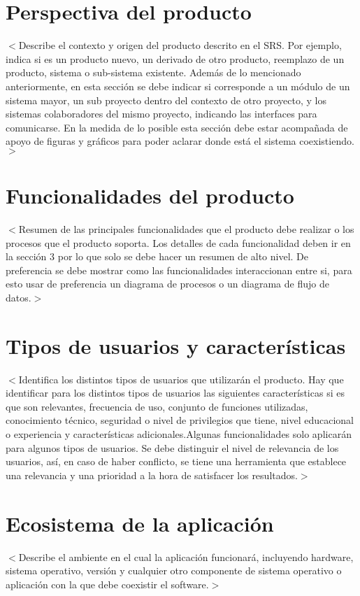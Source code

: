 \documentclass{scrreprt}
\begin{document}
\section{Perspectiva del producto}
$<$Describe el contexto y origen del producto descrito en el SRS.
Por ejemplo, indica si es un producto nuevo, un derivado de otro producto, reemplazo de un producto, sistema o sub-sistema existente. 
Además de lo mencionado anteriormente, en esta sección se debe indicar si corresponde a un módulo de un sistema mayor, un sub proyecto dentro del contexto de otro proyecto, y los sistemas colaboradores del mismo proyecto, indicando las interfaces para comunicarse.
En la medida de lo posible esta sección debe estar acompañada de apoyo de figuras y gráficos para poder aclarar donde está el sistema coexistiendo.$>$

\section{Funcionalidades del producto}
$<$Resumen de las principales funcionalidades que el producto debe realizar o los procesos que el producto soporta.
Los detalles de cada funcionalidad deben ir en la sección 3 por lo que solo se debe hacer un resumen de alto nivel.
De preferencia se debe mostrar como las funcionalidades interaccionan entre si, para esto usar de preferencia un diagrama de procesos o un diagrama de flujo de datos.$>$

\section{Tipos de usuarios y características}
$<$Identifica los distintos tipos de usuarios que utilizarán el producto. Hay que identificar para los distintos tipos de usuarios las siguientes características si es que son relevantes, frecuencia de uso, conjunto de funciones utilizadas, conocimiento técnico, seguridad o nivel de privilegios que tiene, nivel educacional o experiencia y características adicionales.Algunas funcionalidades solo aplicarán para algunos tipos de usuarios. Se debe distinguir el nivel de relevancia de los usuarios, así, en caso de haber conflicto, se tiene una herramienta que establece una relevancia y una prioridad a la hora de satisfacer los resultados.$>$

\section{Ecosistema de la aplicación}
$<$Describe el ambiente en el cual la aplicación funcionará, incluyendo hardware, sistema operativo, versión y cualquier otro componente de sistema operativo o aplicación con la que debe coexistir el software.$>$
\end{document}
